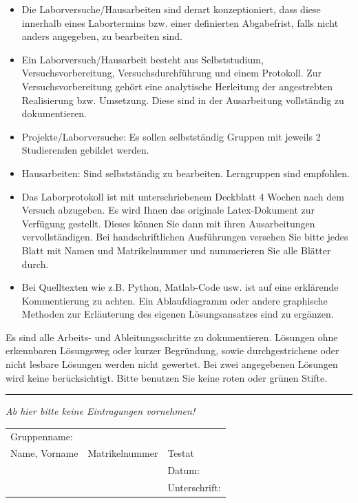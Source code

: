 \documentclass[addpoints,11pt]{exam}
\begin{document}
\begin{coverpages}
\begin{itemize}
\item Die Laborversuche/Hausarbeiten sind derart konzeptioniert, dass diese innerhalb eines Labortermins bzw. einer definierten Abgabefrist, falls nicht anders angegeben, zu bearbeiten sind.
\item Ein Laborversuch/Hausarbeit besteht aus Selbststudium, Versuchsvorbereitung, Versuchsdurchführung und einem Protokoll. Zur Versuchsvorbereitung gehört eine analytische Herleitung der angestrebten Realisierung bzw. Umsetzung. Diese sind in der Ausarbeitung vollständig zu dokumentieren. %
\item Projekte/Laborversuche: Es sollen selbstständig Gruppen mit jeweils 2 Studierenden gebildet werden. 
\item Hausarbeiten: Sind selbstständig zu bearbeiten. Lerngruppen sind empfohlen. 
\item Das Laborprotokoll ist mit unterschriebenem Deckblatt 4 Wochen nach dem Versuch abzugeben. Es wird Ihnen das originale Latex-Dokument zur Verfügung gestellt. Dieses können Sie dann mit ihren Ausarbeitungen vervollständigen. Bei handschriftlichen Ausführungen versehen Sie bitte jedes Blatt mit Namen und Matrikelnummer und nummerieren Sie alle Blätter durch.
\item Bei Quelltexten wie z.B. Python, Matlab-Code usw. ist auf eine erklärende Kommentierung zu achten. Ein Ablaufdiagramm oder andere graphische Methoden zur Erläuterung des eigenen Lösungsansatzes sind zu ergänzen.
\end{itemize}

Es sind alle Arbeits- und Ableitungsschritte zu dokumentieren. Lösungen ohne erkennbaren Lösungsweg oder kurzer Begründung, sowie durchgestrichene oder nicht lesbare Lösungen werden nicht gewertet. Bei zwei angegebenen Lösungen wird keine berücksichtigt. Bitte benutzen Sie keine roten oder grünen Stifte.

	\vspace{2cm}
	\hrule
	\emph{Ab hier bitte keine Eintragungen vornehmen!}
	
	\vspace{2cm}

\begin{tabularx}{\textwidth}{ p{6cm} | p{6cm} | p{4cm} }
	    \toprule
         Gruppenname: &  & \\
         \cline{1-2}
         Name, Vorname & Matrikelnummer & Testat \\
         \hline
          &  & Datum: \\
             \hline
          & &  Unterschrift:\\
		\bottomrule
	\end{tabularx}
	
\end{coverpages}
\end{document}

